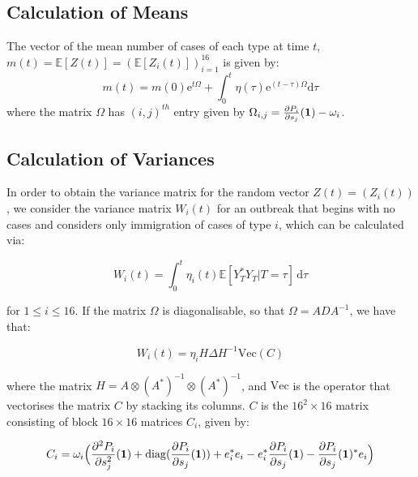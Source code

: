\documentclass{article}
\begin{document}
\subsection{Calculation of Means}

The vector of the mean number of cases of each type at time $t$, $m(t) = {\mathbb{E}}[Z(t)] = ({\mathbb{E}}[Z_i(t)])_{i=1}^{16}$ is given by:
\begin{equation}
m(t) = m(0){\mathrm{e}}^{t\Omega} + \int_0^t \eta(\tau){\mathrm{e}}^{(t-\tau)\Omega} {\mathrm{d}}\tau 
\end{equation}
where the matrix $\Omega$ has $(i, j)^{th}$ entry given by $\Omega_{i, j} = \frac{\partial P_i}{\partial s_j}({\vb{1}}) - \omega_i$. 





\subsection{Calculation of Variances}
In order to obtain the variance matrix for the random vector $Z(t) = (Z_i(t))$, we consider the variance matrix $W_i(t)$ for an outbreak that begins with no cases and considers only immigration of cases of type $i$, which can be calculated via:

\begin{equation}
W_i(t) = \int_0^t \eta_i(t) {\mathbb{E}}[Y_T^*Y_T | T=\tau] \, {\mathrm{d}}\tau
\end{equation}

for $1 \leq i \leq 16$. If the matrix $\Omega$ is diagonalisable, so that $\Omega = ADA^{-1}$, we have that:

\begin{equation}
W_i(t) = \eta_i H\Delta H^{-1} {\mathrm{Vec}}(C) \label{Delta}
\end{equation}
 
where the matrix $H= A \otimes (A^*)^{-1} \otimes (A^*)^{-1}$, and ${\mathrm{Vec}}$ is the operator that vectorises the matrix $C$ by stacking its columns. $C$ is the $16^2 \times 16$ matrix consisting of block $16 \times 16$ matrices $C_i$, given by:

\begin{equation}
C_i = \omega_i\Big(\frac{\partial^2 P_i}{\partial s_j^2}({\vb{1}}) + {\mathrm{diag}}(\frac{\partial P_i}{\partial s_j}({\vb{1}})) + e_i^*e_i - e_i^* \frac{\partial P_i}{\partial s_j}({\vb{1}}) - \frac{\partial P_i}{\partial s_j}({\vb{1}})^*e_i\Big)
\end{equation}
\end{document}
